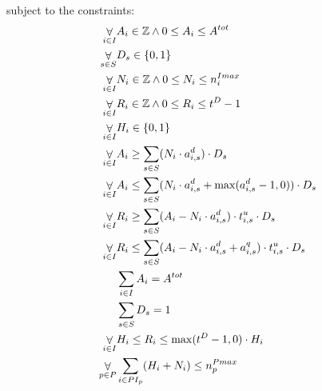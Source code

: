 {  subject to the constraints:
  \nopagebreak 
  \begin{align}
     \label{cSolutionConstraintsBegin}\mathop\forall\limits_{i \in \INSTANCE} & \TaskAssignment_i \in \mathbb{Z} \land 0 \leq \TaskAssignment_i \leq \totalTasks  \\
     \mathop\forall\limits_{s \in \STORAGE}  & \DataAssignment_s \in \{0, 1\} \\ 
     \mathop\forall\limits_{i \in \INSTANCE} & \NumberInstances_i \in \mathbb{Z} \land 0 \leq \NumberInstances_i \leq \instanceMaxMachines_i \\
     \mathop\forall\limits_{i \in \INSTANCE} & \TailTaskHours_i \in \mathbb{Z} \land 0 \leq \TailTaskHours_i \leq \deadline - 1 \\
     \label{cSolutionConstraintsEnd}\mathop\forall\limits_{i \in \INSTANCE} & \HasTail_i \in \{0, 1\} \\
     \label{cTaskAssignmentBounds}\mathop\forall\limits_{i \in \INSTANCE}
          & \TaskAssignment_i \geq \sum_{s \in \STORAGE} (\NumberInstances_i \cdot
          \tasksPerDeadline_{i,s}) \cdot \DataAssignment_s
          \\
      \label{cTaskAssignmentBounds2}\mathop\forall\limits_{i \in \INSTANCE}
          & \TaskAssignment_i \leq  \sum_{s \in \STORAGE} (\NumberInstances_i \cdot
          \tasksPerDeadline_{i,s} + \max(\tasksPerDeadline_{i,s} - 1, 0)) \cdot
          \DataAssignment_s\\
     \label{cTailTasksHoursBounds}\mathop\forall\limits_{i \in \INSTANCE}
          & \TailTaskHours_i \geq \sum_{s \in \STORAGE} (\TaskAssignment_i - \NumberInstances_i \cdot
          \tasksPerDeadline_{i,s}) \cdot \unitTime_{i,s} \cdot \DataAssignment_s
          \\ 
     \label{cTailTasksHoursBounds2}\mathop\forall\limits_{i \in \INSTANCE}
          & \TailTaskHours_i  \leq \sum_{s \in \STORAGE} (\TaskAssignment_i -
          \NumberInstances_i \cdot \tasksPerDeadline_{i,s} +
          \tasksPerTimeQuantum_{i,s}) \cdot \unitTime_{i,s} \cdot
          \DataAssignment_s\\ 
     \label{cSumTasks}& \sum\limits_{i \in \INSTANCE} \TaskAssignment_i = \totalTasks \\
     \label{cData}& \sum\limits_{s \in \STORAGE} \DataAssignment_s = 1 \\ 
     \label{cSetHasTailBounds}\mathop\forall\limits_{i \in \INSTANCE} &
     \HasTail_i \leq \TailTaskHours_i \leq \max(\deadline-1,0)\cdot\HasTail_i
     \\ \label{cMaxMachines}\mathop\forall\limits_{p \in \PROVIDER} & \sum_{i \in \PROVIDERINSTANCES_p} (\HasTail_i + \NumberInstances_i) \leq \providerMaxMachines_p
  \end{align}

}
